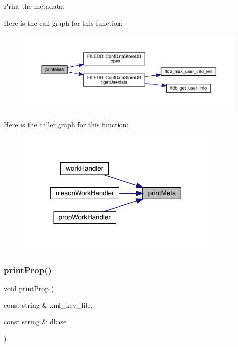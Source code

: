 Print the metadata. 

Here is the call graph for this function\+:
\nopagebreak
\begin{figure}[H]
\begin{center}
\leavevmode
\includegraphics[width=350pt]{d5/d55/adat-devel_2main_2dbutil_2dbutil_8cc_a0577d572da492642f9cf5f404d0116d9_cgraph}
\end{center}
\end{figure}
Here is the caller graph for this function\+:
\nopagebreak
\begin{figure}[H]
\begin{center}
\leavevmode
\includegraphics[width=278pt]{d5/d55/adat-devel_2main_2dbutil_2dbutil_8cc_a0577d572da492642f9cf5f404d0116d9_icgraph}
\end{center}
\end{figure}
\mbox{\label{adat-devel_2main_2dbutil_2dbutil_8cc_a6ff051251360484ce00ee0688f3636b3}} 
\subsubsection{\texorpdfstring{printProp()}{printProp()}}
{\footnotesize\ttfamily void print\+Prop (\begin{DoxyParamCaption}\item[{const string \&}]{xml\+\_\+key\+\_\+file,  }\item[{const string \&}]{dbase }\end{DoxyParamCaption})}



